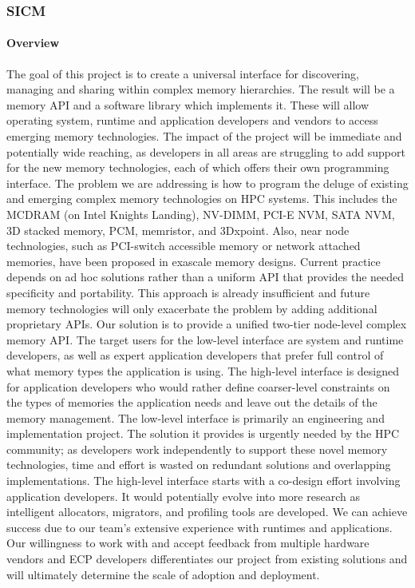 \subsubsection{ SICM} 
\paragraph{Overview} The goal of this project is to create a universal interface for discovering, managing and sharing within complex memory hierarchies. The result will be a memory API and a software library which implements it. These will allow operating system, runtime and application developers and vendors to access emerging memory technologies. The impact of the project will be immediate and potentially wide reaching, as developers in all areas are struggling to add support for the new memory technologies, each of which offers their own programming interface. The problem we are addressing is how to program the deluge of existing and emerging complex memory technologies on HPC systems. This includes the MCDRAM (on Intel Knights Landing), NV-DIMM, PCI-E NVM, SATA NVM, 3D stacked memory, PCM, memristor, and 3Dxpoint. Also, near node technologies, such as PCI-switch accessible memory or network attached memories, have been proposed in exascale memory designs. Current practice depends on ad hoc solutions rather than a uniform API that provides the needed specificity and portability. This approach is already insufficient and future memory technologies will only exacerbate the problem by adding additional proprietary APIs. Our solution is to provide a unified two-tier node-level complex memory API. The target users for the low-level interface are system and runtime developers, as well as expert application developers that prefer full control of what memory types the application is using. The high-level interface is designed for application developers who would rather define coarser-level constraints on the types of memories the application needs and leave out the details of the memory management. The low-level interface is primarily an engineering and implementation project. The solution it provides is urgently needed by the HPC community; as developers work independently to support these novel memory technologies, time and effort is wasted on redundant solutions and overlapping implementations. The high-level interface starts with a co-design effort involving application developers. It would potentially evolve into more research as intelligent allocators, migrators, and profiling tools are developed. We can achieve success due to our team’s extensive experience with runtimes and applications. Our willingness to work with and accept feedback from multiple hardware vendors and ECP developers differentiates our project from existing solutions and will ultimately determine the scale of adoption and deployment. 
